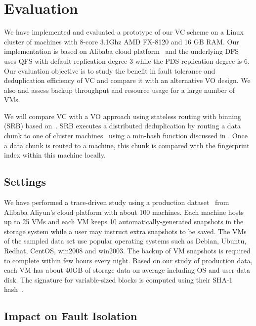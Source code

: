 \section{Evaluation}
\label{sect:evaluation}
We have implemented and evaluated a prototype of our VC scheme on a Linux cluster of machines with
8-core 3.1Ghz AMD FX-8120 and 16 GB RAM. 
Our implementation is based on Alibaba cloud platform~\cite{Aliyun,WeiZhangIEEE}
and the underlying DFS uses  QFS with default replication degree 3 while the PDS replication degree is 6.
Our evaluation objective is to
study the benefit in fault tolerance and   deduplication efficiency of VC and compare it
with an alternative VO design. We also and assess backup throughput and  resource usage for a large number of VMs.

We will compare VC with a VO approach  using stateless routing with binning (SRB) 
based on~\cite{Dong2011,extreme_binning09}.
SRB executes a distributed deduplication by routing a data chunk to one of cluster machines~\cite{Dong2011}
using  a min-hash function discussed in \cite{extreme_binning09}. Once a data chunk is routed to
a machine, this chunk is compared with the fingerprint index within this machine locally. 

\subsection{Settings}
We have performed a trace-driven study using a production dataset~\cite{WeiZhangIEEE} from 
Alibaba Aliyun's cloud platform with about 100 machines. 
Each machine hosts up to 25 VMs and each VM keeps 10 automatically-generated snapshots in the storage system while
a user may instruct extra snapshots to be saved.
The VMs of the sampled data set use popular operating systems such as 
Debian, Ubuntu, Redhat, CentOS, win2008 and win2003. 
The backup of VM snapshots is required to complete within few  hours every night.
Based on our study of production  data,  each VM has about 40GB of storage  data  on average
including OS and user data disk.
The signature for variable-sized blocks is computed using their SHA-1 hash~\cite{similar94,rabin81}. 

\subsection{Impact on Fault Isolation}

